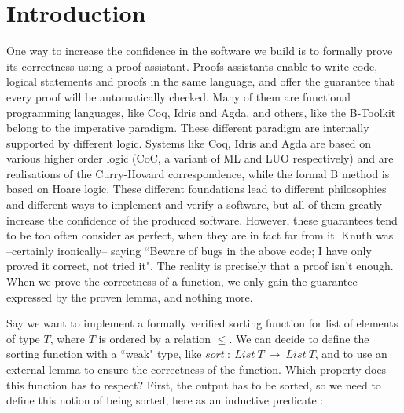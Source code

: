 \section{Introduction}


One way to increase the confidence in the software we build is to formally prove its correctness using a proof assistant. Proofs assistants enable to write code, logical statements and proofs in the same language, and offer the guarantee that every proof will be automatically checked. Many of them are functional programming languages, like Coq, Idris and Agda, and others, like the B-Toolkit belong to the imperative paradigm. These different paradigm are internally supported by different logic. Systems like Coq, Idris and Agda are based on various higher order logic (CoC, a variant of ML and LUO respectively) and are realisations of the Curry-Howard correspondence, while the formal B method is based on Hoare logic. These different foundations lead to different philosophies and different ways to implement and verify a software, but all of them greatly increase the confidence of the produced software. However, these guarantees tend to be too often consider as perfect, when they are in fact far from it. Knuth was --certainly ironically-- saying ``Beware of bugs in the above code; I have only proved it correct, not tried it". The reality is precisely that a proof isn't enough. When we prove the correctness of a function, we only gain the guarantee expressed by the proven lemma, and nothing more. 

Say we want to implement a formally verified sorting function for list of elements of type $T$, where $T$ is ordered by a relation $\leq$.
We can decide to define the sorting function with a ``weak" type, like $sort\ :\ List\ T\ \rightarrow\ List\ T$, and to use an external lemma to ensure the correctness of the function. Which property does this function has to respect? First, the output has to be sorted, so we need to define this notion of being sorted, here as an inductive predicate :

